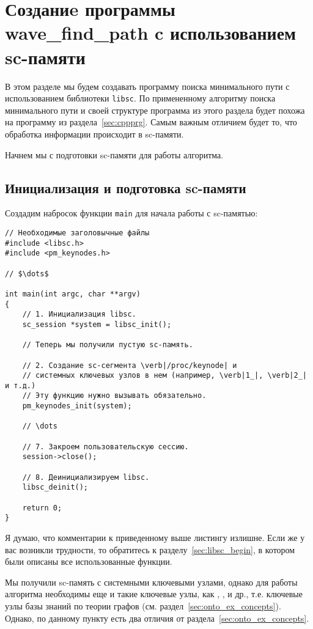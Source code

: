 \section{Созданиe программы wave\_find\_path c использованием sc-памяти}
\label{sec:libscprg}

В этом разделе мы будем создавать программу поиска минимального пути с
использованием библиотеки \verb|libsc|. По примененному алгоритму
поиска минимального пути и своей структуре программа из этого раздела
будет похожа на программу из раздела~\ref{sec:cppprg}. Самым важным
отличием будет то, что обработка информации происходит в sc-памяти.

Начнем мы с подготовки sc-памяти для работы алгоритма.

\subsection{Инициализация и подготовка sc-памяти}
\label{sec:libscprg_init_sc_memory}

Создадим набросок функции \lstinline|main| для начала работы с
sc-памятью:

\begin{lstlisting}[texcl]
// Необходимые заголовычные файлы
#include <libsc.h>
#include <pm_keynodes.h>

// $\dots$

int main(int argc, char **argv)
{
    // 1. Инициализация libsc.
    sc_session *system = libsc_init();

    // Теперь мы получили пустую sc-память.

    // 2. Создание sc-сегмента \verb|/proc/keynode| и
    // системных ключевых узлов в нем (например, \verb|1_|, \verb|2_| и т.д.)
    // Эту функцию нужно вызывать обязательно.
    pm_keynodes_init(system);

    // \dots

    // 7. Закроем пользовательскую сессию.
    session->close();

    // 8. Деинициализируем libsc.
    libsc_deinit();

    return 0;
}
\end{lstlisting}

Я думаю, что комментарии к приведенному выше листингу излишне. Если же
у вас возникли трудности, то обратитесь к
разделу~\ref{sec:libsc_begin}, в котором были описаны все
использованные функции.

Мы получили sc-память с системными ключевыми узлами, однако для работы
алгоритма необходимы еще и такие ключевые узлы, как
, ,  и др.,
т.е. ключевые узлы базы знаний по теории графов
(см. раздел~\ref{sec:onto_ex_concepts}). Однако, по данному пункту
есть два отличия от раздела~\ref{sec:onto_ex_concepts}.

